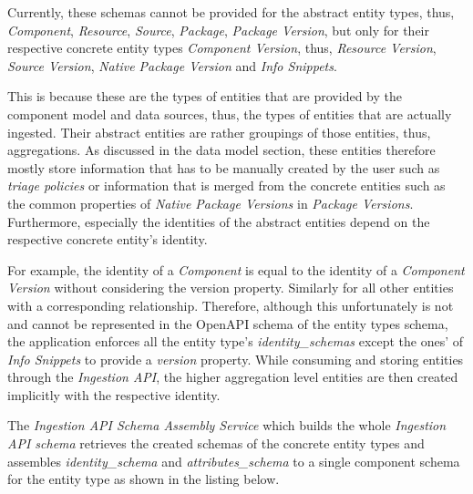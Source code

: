 Currently, these schemas cannot be provided for the abstract entity types, thus, \emph{Component}, \emph{Resource}, \emph{Source}, \emph{Package}, \emph{Package Version}, but only for their respective concrete entity types \emph{Component Version}, thus, \emph{Resource Version}, \emph{Source Version}, \emph{Native Package Version} and \emph{Info Snippets}.\par 
This is because these are the types of entities that are provided by the component model and data sources, thus, the types of entities that are actually ingested. Their abstract entities are rather groupings of those entities, thus, aggregations. As discussed in the data model section, these entities therefore mostly store information that has to be manually created by the user such as \emph{triage policies} or information that is merged from the concrete entities such as the common properties of \emph{Native Package Versions} in \emph{Package Versions}. Furthermore, especially the identities of the abstract entities depend on the respective concrete entity's identity.\par
For example, the identity of a \emph{Component} is equal to the identity of a \emph{Component Version} without considering the version property. Similarly for all other entities with a corresponding relationship. Therefore, although this unfortunately is not and cannot be represented in the OpenAPI schema of the entity types schema, the application enforces all the entity type's \emph{identity\_schemas} except the ones' of \emph{Info Snippets} to provide a \emph{version} property. While consuming and storing entities through the \emph{Ingestion API}, the higher aggregation level entities are then created implicitly with the respective identity.\par
The \emph{Ingestion API Schema Assembly Service} which builds the whole \emph{Ingestion API schema} retrieves the created schemas of the concrete  entity types and assembles \emph{identity\_schema} and \emph{attributes\_schema} to a single component schema for the entity type as shown in the listing below.

